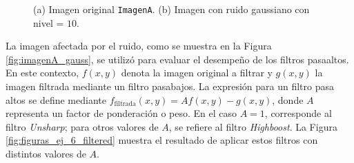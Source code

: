\documentclass[11pt, twocolumn]{article}
\begin{document}
\begin{figure}[htbp]
  \centering
  \hfill
  \hfill
  \caption{(a) Imagen original \texttt{ImagenA}. (b) Imagen con ruido gaussiano con nivel = $10$.}
  \label{fig:figuras_ej_6}
\end{figure}

La imagen afectada por el ruido, como se muestra en la Figura \ref{fig:imagenA_gauss}, se utilizó para evaluar el desempeño de los filtros pasaaltos. En este contexto, $f(x, y)$ denota la imagen original a filtrar y $g(x, y)$ la imagen filtrada mediante un filtro pasabajos. La expresión para un filtro pasa altos se define mediante $f_{\text{filtrada}}(x, y) = A f(x, y) - g(x, y)$, donde $A$ representa un factor de ponderación o peso. En el caso $A=1$, corresponde al filtro \textit{Unsharp}; para otros valores de $A$, se refiere al filtro \textit{Highboost}. La Figura \ref{fig:figuras_ej_6_filtered} muestra el resultado de aplicar estos filtros con distintos valores de $A$.
\end{document}
